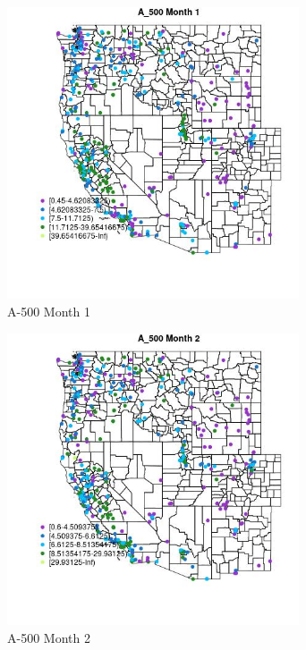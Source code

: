 \begin{figure} 
\centering  
\includegraphics[width=0.77\textwidth]{Code_Outputs/ML_input_report_ML_input_PM25_Step5_part_d_de_duplicated_aves_ML_input_MapObsMo1A_500.jpg} 
\caption{\label{fig:ML_input_report_ML_input_PM25_Step5_part_d_de_duplicated_aves_ML_inputMapObsMo1A_500}A-500 Month 1} 
\end{figure} 
 

\begin{figure} 
\centering  
\includegraphics[width=0.77\textwidth]{Code_Outputs/ML_input_report_ML_input_PM25_Step5_part_d_de_duplicated_aves_ML_input_MapObsMo2A_500.jpg} 
\caption{\label{fig:ML_input_report_ML_input_PM25_Step5_part_d_de_duplicated_aves_ML_inputMapObsMo2A_500}A-500 Month 2} 
\end{figure} 
 

